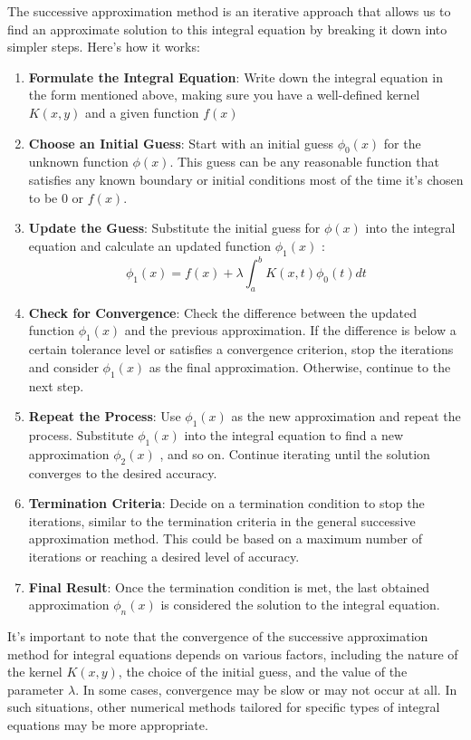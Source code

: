 \documentclass[]{article}
\begin{document}
The successive approximation method is an iterative approach that allows us to find an approximate solution to this integral equation by breaking it down into simpler steps. Here's how it works:

\begin{enumerate}[itemsep=10pt]
    \item \textbf{Formulate the Integral Equation}: Write down the integral equation in the form mentioned above, making sure you have a well-defined kernel $K(x,y)$ and a given function $f(x)$ 
    \item \textbf{Choose an Initial Guess}: Start with an initial guess $\phi_0(x)$ for the unknown function $\phi(x)$. This guess can be any reasonable function that satisfies any known boundary or initial conditions most of the time it's chosen to be 0 or $f(x)$.
    \item \textbf{Update the Guess}: Substitute the initial guess for $\phi(x)$ into the integral equation and calculate an updated function $\phi_1(x)$ :
    \[
       \phi_1(x) = f(x) + \lambda\int_{a}^{b} K(x,t) \phi_0(t)dt     
    \]
    \item \textbf{Check for Convergence}: Check the difference between the updated function $\phi_1(x)$ and the previous approximation. If the difference is below a certain tolerance level or satisfies a convergence criterion, stop the iterations and consider $\phi_1(x)$ as the final approximation. Otherwise, continue to the next step.
    \item \textbf{Repeat the Process}: Use $\phi_1(x)$ as the new approximation and repeat the process. Substitute $\phi_1(x)$ into the integral equation to find a new approximation $\phi_2(x)$ , and so on. Continue iterating until the solution converges to the desired accuracy.
    \item \textbf{Termination Criteria}: Decide on a termination condition to stop the iterations, similar to the termination criteria in the general successive approximation method. This could be based on a maximum number of iterations or reaching a desired level of accuracy.    
    \item \textbf{Final Result}: Once the termination condition is met, the last obtained approximation $\phi_n(x)$ is considered the solution to the integral equation.
\end{enumerate}
It's important to note that the convergence of the successive approximation method for integral equations depends on various factors, including the nature of the kernel $K(x,y)$, the choice of the initial guess, and the value of the parameter 
$\lambda$. In some cases, convergence may be slow or may not occur at all. In such situations, other numerical methods tailored for specific types of integral equations may be more appropriate.
\end{document}
